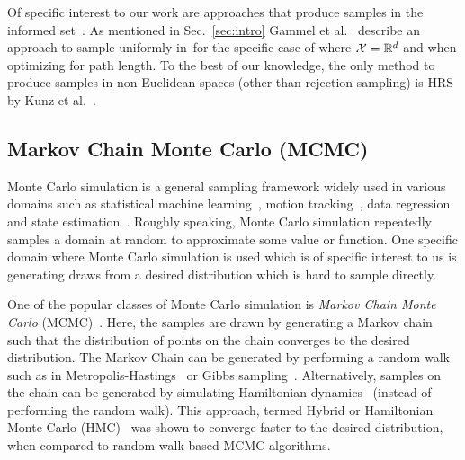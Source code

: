 \documentclass[letterpaper, 10 pt, conference]{ieeeconf}  %
\begin{document}
Of specific interest to our work are approaches that produce samples in the informed set~\Cinf.
As mentioned in Sec.~\ref{sec:intro} Gammel et al.~\cite{GSB14} describe an approach to sample uniformly in~\Cinf for the specific case of where $\mathcal{X} = \mathbb{R}^d$ and when optimizing for path length.
To the best of our knowledge, the only method to produce samples in non-Euclidean spaces (other than rejection sampling) is HRS by Kunz et al.~\cite{KTC16}.

\subsection{Markov Chain Monte Carlo (MCMC)}
\label{subsec:mcmc}
Monte Carlo simulation is a general sampling framework widely used in various domains such as
statistical machine learning~\cite{M97},
motion tracking~\cite{KBD04}, 
data regression~\cite{TL11} and 
state estimation~\cite{ASC13}.
Roughly speaking, Monte Carlo simulation repeatedly samples a domain at random to approximate some value or function.
One specific domain where Monte Carlo simulation is used which is of specific interest to us is generating draws from a desired distribution which is hard to sample directly.

One of the popular classes of Monte Carlo simulation is 
\emph{Markov Chain Monte Carlo} (MCMC)~\cite{ADDJ03}.
Here, the samples are drawn by generating a Markov chain such that the distribution of points on the chain converges to the desired distribution.
The Markov Chain can be generated by performing a random walk such as
in Metropolis-Hastings~\cite{CG95} or Gibbs sampling~\cite{CK94}.
Alternatively, samples on the chain can be generated by simulating Hamiltonian dynamics~\cite{N94} (instead of performing the random walk).
This approach, termed Hybrid or Hamiltonian Monte Carlo (HMC)~\cite{N11} was shown to converge faster to the desired distribution, when compared to random-walk based MCMC algorithms.
\end{document}
